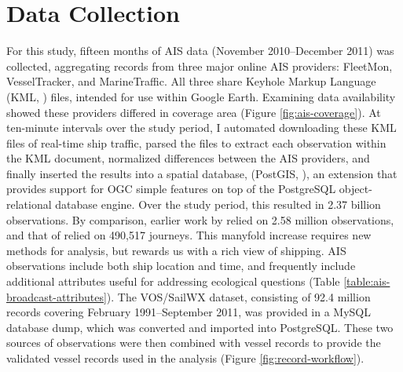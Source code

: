 \section{Data Collection}

For this study, fifteen months of AIS data (November 2010--December 2011) was collected, aggregating records from three major online AIS providers: FleetMon, VesselTracker, and MarineTraffic. All three share Keyhole Markup Language (KML, \citeauthor{KML}) files, intended for use within Google Earth. Examining data availability showed these providers differed in coverage area (Figure \ref{fig:ais-coverage}).  At ten-minute intervals over the study period, I automated downloading these KML files of real-time ship traffic, parsed the files to extract each observation within the KML document, normalized differences between the AIS providers, and finally inserted the results into a spatial database, (\textsf{PostGIS}, \citeauthor{ramsey2005postgis}), an extension that provides support for OGC simple features \citep{OGCSimple} on top of the \textsf{PostgreSQL} \citep{postgresql} object-relational database engine. Over the study period, this resulted in 2.37 billion observations. By comparison, earlier work by \cite{Halpern2008} relied on 2.58 million observations, and that of \cite{Kaluza2010} relied on 490,517 journeys. This manyfold increase requires new methods for analysis, but rewards us with a rich view of shipping. %
AIS observations include both ship location and time, and frequently include additional attributes useful for addressing ecological questions (Table \ref{table:ais-broadcast-attributes}).  The VOS/SailWX dataset, consisting of 92.4 million records covering February 1991--September 2011, was provided in a \textsf{MySQL} database dump, which was converted and imported into \textsf{PostgreSQL}. These two sources of observations were then combined with vessel records to provide the validated vessel records used in the analysis (Figure \ref{fig:record-workflow}).

